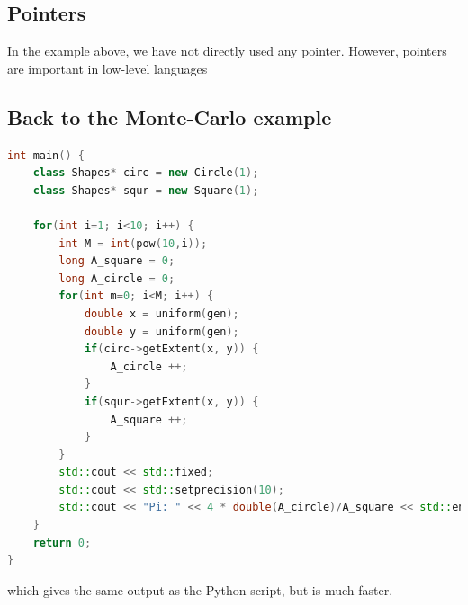 \subsection{Pointers}
In the example above, we have not directly used any pointer. However, pointers are important in low-level languages 

\subsection{Back to the Monte-Carlo example}
\begin{lstlisting}[language=c++]
int main() {   
	class Shapes* circ = new Circle(1);
	class Shapes* squr = new Square(1);

	for(int i=1; i<10; i++) {
		int M = int(pow(10,i));
		long A_square = 0;
		long A_circle = 0;
		for(int m=0; i<M; i++) {
			double x = uniform(gen);
			double y = uniform(gen);
			if(circ->getExtent(x, y)) {
				A_circle ++;
			}
			if(squr->getExtent(x, y)) {
				A_square ++;
			}
		}
		std::cout << std::fixed;
		std::cout << std::setprecision(10);
		std::cout << "Pi: " << 4 * double(A_circle)/A_square << std::endl;
	}
	return 0;
}
\end{lstlisting}
which gives the same output as the Python script, but is much faster. 

